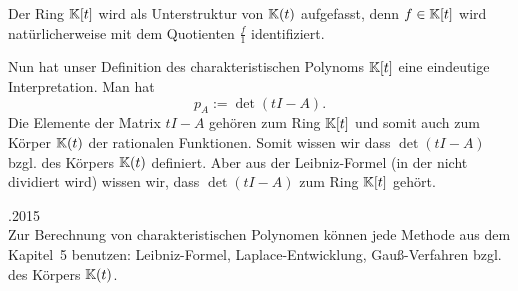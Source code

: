 Der Ring $\mathbb K[t]$ wird als Unterstruktur von $\mathbb K(t)$ aufgefasst, denn $f \in \mathbb K[t]$ wird natürlicherweise mit dem Quotienten $\frac{f}{1}$ identifiziert. 

Nun hat unser Definition des charakteristischen Polynoms $\mathbb K[t]$ eine eindeutige Interpretation. Man hat
\[
	p_A := \det ( t I - A).
\]
Die Elemente der Matrix $t I - A$ gehören zum Ring $\mathbb K[t]$ und somit auch zum Körper $\mathbb K(t)$ der rationalen Funktionen. Somit wissen wir dass $\det(t I - A)$ bzgl. des Körpers $\mathbb K(t)$ definiert. Aber aus der Leibniz-Formel (in der nicht dividiert wird) wissen wir, dass $\det( t I - A)$ zum Ring $\mathbb K[t]$ gehört.

\begin{bem} \hfill {.2015} \\
	Zur Berechnung von charakteristischen Polynomen können jede Methode aus dem Kapitel~5 benutzen: Leibniz-Formel, Laplace-Entwicklung, Gauß-Verfahren bzgl. des Körpers $ \mathbb K(t) $.
\end{bem}

